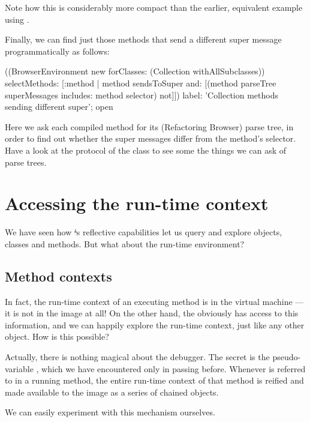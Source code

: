 \documentclass[a4paper,10pt,twoside]{book}
\begin{document}
{Note how this is considerably more compact than the earlier, equivalent example using .

Finally, we can find just those methods that send a different super message programmatically as follows:
\begin{code}{}
((BrowserEnvironment new forClasses: (Collection withAllSubclasses))
	selectMethods: [:method | 
		method sendsToSuper
		and: [(method parseTree superMessages includes: method selector) not]])
	label: 'Collection methods sending different super';
	open
\end{code}
Here we ask each compiled method for its (Refactoring Browser) parse tree, in order to find out whether the super messages differ from the method's selector.
Have a look at the  protocol of the class  to see some the things we can ask of parse trees.

\section{Accessing the run-time context}

We have seen how \st's reflective capabilities let us query and explore objects, classes and methods.  But what about the run-time environment?

\subsection{Method contexts}

In fact, the run-time context of an executing method is in the virtual machine --- it is not in the image at all!
On the other hand, the  obviously has access to this information, and we can happily explore the run-time context, just like any other object.
How is this possible?

Actually, there is nothing magical about the debugger.
The secret is the pseudo-variable , which we have encountered only in passing before.
Whenever  is referred to in a running method, the entire run-time context of that method is reified and made available to the image as a series of chained  objects.

We can easily experiment with this mechanism ourselves.


}
\end{document}
